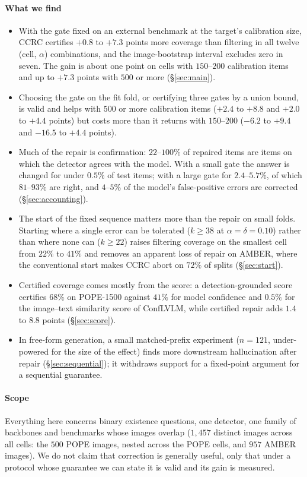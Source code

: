 \paragraph{What we find}
\begin{itemize}
\item With the gate fixed on an external benchmark at the target's calibration size, CCRC certifies $+0.8$ to $+7.3$ points
  more coverage than filtering in all twelve (cell, $\alpha$) combinations, and the image-bootstrap interval excludes zero in
  seven. The gain is about one point on cells with $150$--$200$ calibration items and up to $+7.3$ points with $500$ or more
  (\S\ref{sec:main}).
\item Choosing the gate on the fit fold, or certifying three gates by a union bound, is valid and helps with $500$ or more calibration
  items ($+2.4$ to $+8.8$ and $+2.0$ to $+4.4$ points) but costs more than it returns with $150$--$200$
  ($-6.2$ to $+9.4$ and $-16.5$ to $+4.4$ points).
\item Much of the repair is confirmation: $22$--$100\%$ of repaired items are items on which the detector agrees with the model.
  With a small gate the answer is changed for under $0.5\%$ of test items; with a large gate for $2.4$--$5.7\%$, of which $81$--$93\%$
  are right, and $4$--$5\%$ of the model's false-positive errors are corrected (\S\ref{sec:accounting}).
\item The start of the fixed sequence matters more than the repair on small folds. Starting where a single error can be
  tolerated ($k\ge38$ at $\alpha=\delta=0.10$) rather than where none can ($k\ge22$) raises filtering coverage on the smallest cell
  from $22\%$ to $41\%$ and removes an apparent loss of repair on AMBER, where the conventional start makes CCRC abort on $72\%$
  of splits (\S\ref{sec:start}).
\item Certified coverage comes mostly from the score: a detection-grounded score certifies $68\%$ on POPE-1500 against $41\%$ for
  model confidence and $0.5\%$ for the image--text similarity score of ConfLVLM, while certified repair adds $1.4$ to $8.8$ points
  (\S\ref{sec:score}).
\item In free-form generation, a small matched-prefix experiment ($n=121$, under-powered for the size of the effect) finds more downstream
  hallucination after repair (\S\ref{sec:sequential}); it withdraws support for a fixed-point argument for a sequential guarantee.
\end{itemize}

\paragraph{Scope}
Everything here concerns binary existence questions, one detector, one family of backbones and
benchmarks whose images overlap ($1{,}457$ distinct images across all cells: the $500$ POPE images, nested across the POPE cells, and $957$ AMBER images). We do not claim that correction is
generally useful, only that under a protocol whose guarantee we can state it is valid and its
gain is measured.
